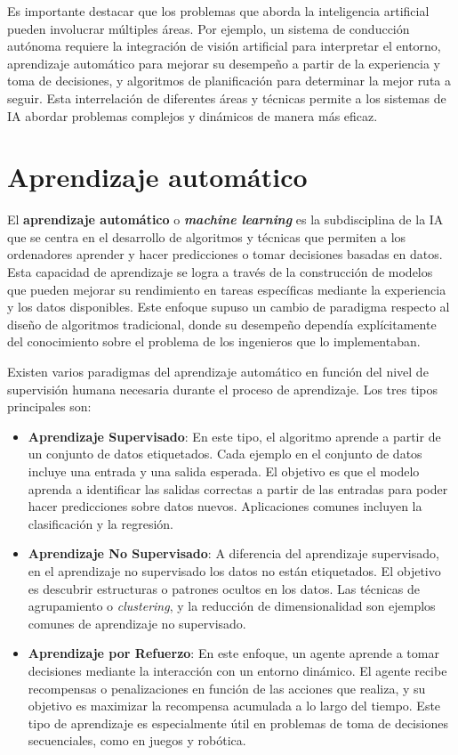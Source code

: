 Es importante destacar que los problemas que aborda la inteligencia artificial pueden involucrar múltiples áreas. Por ejemplo, un sistema de conducción autónoma requiere la integración de visión artificial para interpretar el entorno, aprendizaje automático para mejorar su desempeño a partir de la experiencia y toma de decisiones, y algoritmos de planificación para determinar la mejor ruta a seguir. Esta interrelación de diferentes áreas y técnicas permite a los sistemas de IA abordar problemas complejos y dinámicos de manera más eficaz.

\section{Aprendizaje automático}

El \textbf{aprendizaje automático}  o \textbf{\textit{machine learning}} es la subdisciplina de la IA que se centra en el desarrollo de algoritmos y técnicas que permiten a los ordenadores aprender y hacer predicciones o tomar decisiones basadas en datos. Esta capacidad de aprendizaje se logra a través de la construcción de modelos que pueden mejorar su rendimiento en tareas específicas mediante la experiencia y los datos disponibles. Este enfoque supuso un cambio de paradigma respecto al diseño de algoritmos tradicional, donde su desempeño dependía explícitamente del conocimiento sobre el problema de los ingenieros que lo implementaban.

Existen varios paradigmas del aprendizaje automático en función del nivel de supervisión humana necesaria durante el proceso de aprendizaje. Los tres tipos principales son:

\begin{itemize}
	\item \textbf{Aprendizaje Supervisado}: En este tipo, el algoritmo aprende a partir de un conjunto de datos etiquetados. Cada ejemplo en el conjunto de datos incluye una entrada y una salida esperada. El objetivo es que el modelo aprenda a identificar las salidas correctas a partir de las entradas para poder hacer predicciones sobre datos nuevos. Aplicaciones comunes incluyen la clasificación y la regresión.
	
	\item \textbf{Aprendizaje No Supervisado}: A diferencia del aprendizaje supervisado, en el aprendizaje no supervisado los datos no están etiquetados. El objetivo es descubrir estructuras o patrones ocultos en los datos. Las técnicas de agrupamiento o \textit{clustering}, y la reducción de dimensionalidad son ejemplos comunes de aprendizaje no supervisado.
	
	\item \textbf{Aprendizaje por Refuerzo}: En este enfoque, un agente aprende a tomar decisiones mediante la interacción con un entorno dinámico. El agente recibe recompensas o penalizaciones en función de las acciones que realiza, y su objetivo es maximizar la recompensa acumulada a lo largo del tiempo. Este tipo de aprendizaje es especialmente útil en problemas de toma de decisiones secuenciales, como en juegos y robótica.
\end{itemize}

